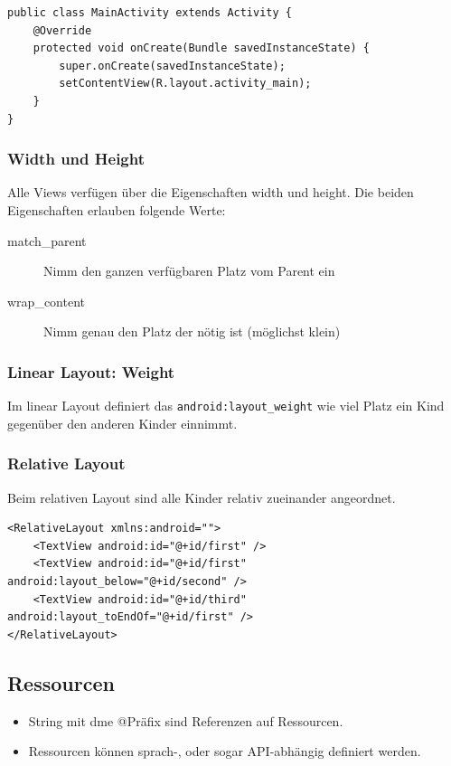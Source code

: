 \begin{lstlisting}[caption=Imperatives deklarieren des Layouts]
public class MainActivity extends Activity {
	@Override
	protected void onCreate(Bundle savedInstanceState) {
		super.onCreate(savedInstanceState);
		setContentView(R.layout.activity_main);
	}
}
\end{lstlisting}

\subsubsection{Width und Height}
Alle Views verfügen über die Eigenschaften width und height. Die beiden Eigenschaften erlauben folgende Werte:
\begin{description}
	\item[match\_parent] Nimm den ganzen verfügbaren Platz vom Parent ein
	\item[wrap\_content] Nimm genau den Platz der nötig ist (möglichst klein)
\end{description}

\subsubsection{Linear Layout: Weight}
Im linear Layout definiert das \lstinline|android:layout_weight| wie viel Platz ein Kind gegenüber den anderen Kinder einnimmt.

\subsubsection{Relative Layout}
Beim relativen Layout sind alle Kinder relativ zueinander angeordnet.
\begin{lstlisting}[caption=Relative Layout]
<RelativeLayout xmlns:android="">
	<TextView android:id="@+id/first" />
	<TextView android:id="@+id/first" android:layout_below="@+id/second" /> 
	<TextView android:id="@+id/third" android:layout_toEndOf="@+id/first" /> 
</RelativeLayout>
\end{lstlisting}

\subsection{Ressourcen}
\begin{itemize}
	\item String mit dme @Präfix sind Referenzen auf Ressourcen. 
	\item Ressourcen können sprach-, oder sogar API-abhängig definiert werden.
\end{itemize}


